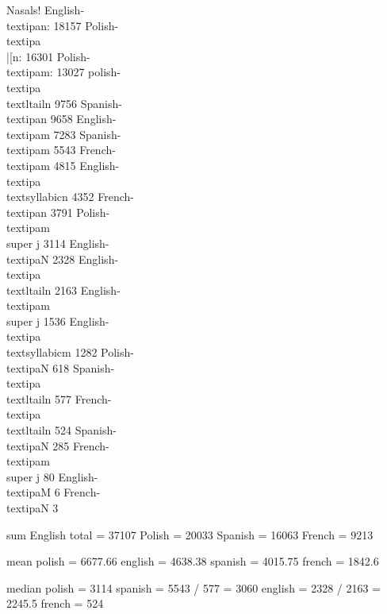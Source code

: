 Nasals!
English-\\textipa{n}: 			18157
Polish-\\textipa{\\|[{n}}: 		16301
Polish-\\textipa{m}: 			13027
polish-\\textipa{\\textltailn}  	9756
Spanish-\\textipa{n}			9658
English-\\textipa{m}			7283
Spanish-\\textipa{m}			5543
French-\\textipa{m}			4815
English-\\textipa{\\textsyllabic{n}}	4352
French-\\textipa{n}			3791
Polish-\\textipa{m\\super j}		3114
English-\\textipa{N}			2328
English-\\textipa{\\textltailn}		2163
English-\\textipa{m\\super j}		1536
English-\\textipa{\\textsyllabic{m}}	1282
Polish-\\textipa{N}			618
Spanish-\\textipa{\\textltailn}		577
French-\\textipa{\\textltailn}		524
Spanish-\\textipa{N}			285
French-\\textipa{m\\super j}		80
English-\\textipa{M}			6
French-\\textipa{N}			3

sum
English total = 37107
Polish = 20033
Spanish = 16063
French = 9213


mean
polish = 6677.66
english = 4638.38
spanish = 4015.75
french = 1842.6

median
polish = 3114
spanish = 5543 / 577 = 3060
english = 2328 / 2163 = 2245.5
french = 524

\fi

\iffalse

